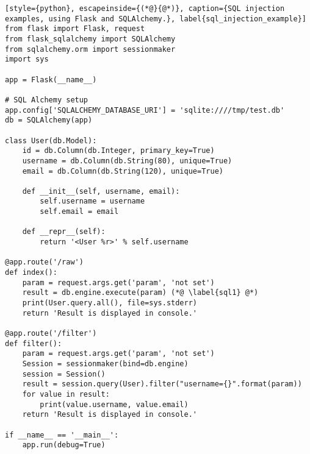 \begin{lstlisting}[style={python}, escapeinside={(*@}{@*)}, caption={SQL injection examples, using Flask and SQLAlchemy.}, label{sql_injection_example}]
from flask import Flask, request
from flask_sqlalchemy import SQLAlchemy
from sqlalchemy.orm import sessionmaker
import sys

app = Flask(__name__)

# SQL Alchemy setup
app.config['SQLALCHEMY_DATABASE_URI'] = 'sqlite:////tmp/test.db'
db = SQLAlchemy(app)

class User(db.Model):
    id = db.Column(db.Integer, primary_key=True)
    username = db.Column(db.String(80), unique=True)
    email = db.Column(db.String(120), unique=True)

    def __init__(self, username, email):
        self.username = username
        self.email = email

    def __repr__(self):
        return '<User %r>' % self.username    
    
@app.route('/raw')
def index():
    param = request.args.get('param', 'not set')
    result = db.engine.execute(param) (*@ \label{sql1} @*)
    print(User.query.all(), file=sys.stderr)
    return 'Result is displayed in console.'

@app.route('/filter')
def filter():
    param = request.args.get('param', 'not set')
    Session = sessionmaker(bind=db.engine)
    session = Session()
    result = session.query(User).filter("username={}".format(param))
    for value in result:
        print(value.username, value.email)
    return 'Result is displayed in console.'

if __name__ == '__main__':
    app.run(debug=True)
\end{lstlisting}
